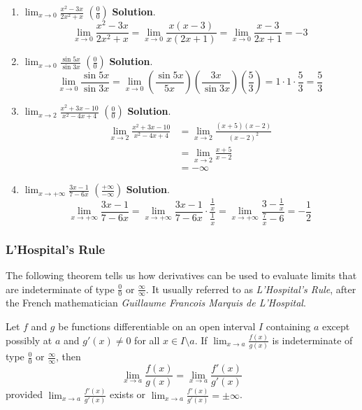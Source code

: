 \documentclass[
  letterpaper,
  DIV=11,
  numbers=noendperiod]{scrartcl}
\begin{document}
\begin{enumerate}
\def\labelenumi{\arabic{enumi}.}
\item
  \(\displaystyle\lim_{x \to 0} \frac{x^2-3x}{2x^2+x}\)
  \(\left(\frac{0}{0}\right)\) \textbf{Solution}. \[
  \displaystyle\lim_{x \to 0} \frac{x^2-3x}{2x^2+x}= \displaystyle\lim_{x \to 0} \frac{x(x-3)}{x(2x+1)}=\displaystyle\lim_{x \to 0} \frac{x-3}{2x+1}=-3
  \]
\item
  \(\displaystyle\lim_{x \to 0} \frac{\sin5x}{\sin3x}\)
  \(\left(\frac{0}{0}\right)\) \textbf{Solution}. \[
  \displaystyle\lim_{x \to 0} \frac{\sin5x}{\sin3x}=\displaystyle\lim_{x \to 0} \left(\frac{\sin5x}{5x}\right)\left(\frac{3x}{\sin3x}\right)\left(\frac{5}{3}\right)=1\cdot1\cdot\frac{5}{3}=\frac{5}{3}
  \]
\item
  \(\displaystyle\lim_{x \to 2} \frac{x^2+3x-10}{x^2-4x+4}\)
  \(\left(\frac{0}{0}\right)\) \textbf{Solution}. \[
  \begin{aligned}
  \displaystyle\lim_{x \to 2} \frac{x^2+3x-10}{x^2-4x+4}&=\displaystyle\lim_{x \to 2}\frac{(x+5)(x-2)}{(x-2)^2}\\&=\displaystyle\lim_{x \to 2}\frac{x+5}{x-2}\\&=-\infty
  \end{aligned}
  \]
\item
  \(\displaystyle\lim_{x \to +\infty}\frac{3x-1}{7-6x}\)
  \(\left(\frac{+\infty}{-\infty}\right)\) \textbf{Solution}. \[
  \displaystyle\lim_{x \to +\infty}\frac{3x-1}{7-6x}=\displaystyle\lim_{x \to +\infty}\frac{3x-1}{7-6x}\cdot \frac{\frac{1}{x}}{\frac{1}{x}}=\displaystyle\lim_{x \to +\infty}\frac{3-\frac{1}{x}}{\frac{7}{x}-6}=-\frac{1}{2}
  \]
\end{enumerate}

\hypertarget{htm:lhospitalsrule}{}
\hypertarget{lhospitals-rule}{%
\subsubsection{L'Hospital's Rule}\label{lhospitals-rule}}

The following theorem tells us how derivatives can be used to evaluate
limits that are indeterminate of type \(\frac{0}{0}\) or
\(\frac{\infty}{\infty}\). It usually referred to as \emph{L'Hospital's
Rule}, after the French mathematician \emph{Guillaume Francois Marquis
de L'Hospital}.

\leavevmode{}%
Let \(f\) and \(g\) be functions differentiable on an open interval
\(I\) containing \(a\) except possibly at \(a\) and \(g'(x)\ne 0\) for
all \(x \in I \setminus {a}\). If
\(\displaystyle\lim_{x \to a}\frac{f(x)}{g(x)}\) is indeterminate of
type \(\frac{0}{0}\) or \(\frac{\infty}{\infty}\), then \[
\displaystyle\lim_{x \to a}\frac{f(x)}{g(x)}=\displaystyle\lim_{x \to a}\frac{f'(x)}{g'(x)}
\] provided \(\displaystyle\lim_{x \to a}\frac{f'(x)}{g'(x)}\) exists or
\(\displaystyle\lim_{x \to a}\frac{f'(x)}{g'(x)}=\pm \infty\).
\end{document}
